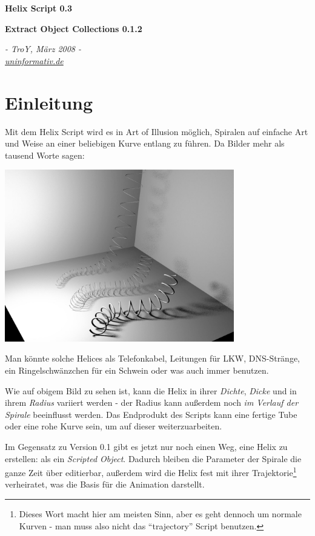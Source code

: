 \documentclass[12pt,a4paper]{scrartcl}
\begin{document}
	\begin{center}
		\begin{LARGE}
			\textbf{Helix Script 0.3}
		\end{LARGE}
		
		\textbf{Extract Object Collections 0.1.2}

		\textit{- TroY, März 2008 -} \\
		\textit{\href{http://www.uninformativ.de}{uninformativ.de}}
	\end{center}
	
\bigskip

\tableofcontents

\pagebreak

\section{Einleitung}
Mit dem Helix Script wird es in Art of Illusion möglich, Spiralen auf
einfache Art und Weise an einer beliebigen Kurve entlang zu führen. Da
Bilder mehr als tausend Worte sagen:
\begin{center}
	\includegraphics[width=0.75\textwidth]{../pics/presentation-bright.jpg}
\end{center}

Man könnte solche Helices als Telefonkabel, Leitungen für LKW, DNS-Stränge,
ein Ringelschwänzchen für ein Schwein oder was auch immer benutzen.

Wie auf obigem Bild zu sehen ist, kann die Helix in ihrer \emph{Dichte},
\emph{Dicke} und in ihrem \emph{Radius} variiert werden - der Radius
kann außerdem noch \emph{im Verlauf der Spirale} beeinflusst werden.
Das Endprodukt des Scripts kann eine fertige Tube oder eine rohe Kurve
sein, um auf dieser weiterzuarbeiten.

Im Gegensatz zu Version 0.1 gibt es jetzt nur noch einen Weg, eine
Helix zu erstellen: als ein \emph{Scripted Object}. Dadurch bleiben die
Parameter der Spirale die ganze Zeit über editierbar, außerdem wird die
Helix fest mit ihrer Trajektorie\footnote{Dieses Wort macht hier am
meisten Sinn, aber es geht dennoch um normale Kurven - man muss also
nicht das ``trajectory'' Script benutzen.} verheiratet, was die Basis
für die Animation darstellt.
\end{document}
